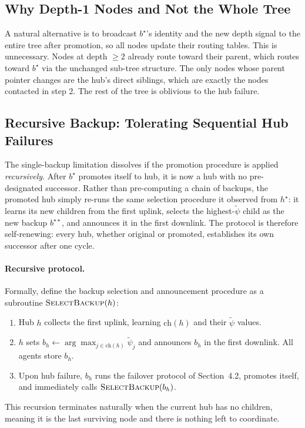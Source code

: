 \documentclass{article}
\begin{document}
\subsection{Why Depth-1 Nodes and Not the Whole Tree}

A natural alternative is to broadcast $b^\star$'s identity and the new depth signal to
the entire tree after promotion, so all nodes update their routing tables. This is
unnecessary. Nodes at depth $\geq 2$ already route toward their parent, which routes
toward $b^\star$ via the unchanged sub-tree structure. The only nodes whose parent
pointer changes are the hub's direct siblings, which are exactly the nodes contacted in
step 2. The rest of the tree is oblivious to the hub failure.

\subsection{Recursive Backup: Tolerating Sequential Hub Failures}

The single-backup limitation dissolves if the promotion procedure is applied
\emph{recursively}. After $b^\star$ promotes itself to hub, it is now a hub with no
pre-designated successor. Rather than pre-computing a chain of backups, the promoted hub
simply re-runs the same selection procedure it observed from $h^\star$: it learns its new
children from the first uplink, selects the highest-$\tilde\psi$ child as the new backup
$b^{\star\star}$, and announces it in the first downlink. The protocol is therefore
self-renewing: every hub, whether original or promoted, establishes its own successor
after one cycle.

\paragraph{Recursive protocol.} Formally, define the backup selection and announcement
procedure as a subroutine $\textsc{SelectBackup}(h)$:
\begin{enumerate}
    \item Hub $h$ collects the first uplink, learning $\mathrm{ch}(h)$ and their
        $\tilde\psi$ values.
    \item $h$ sets $b_h \leftarrow \arg\max_{j \in \mathrm{ch}(h)} \tilde\psi_j$ and
        announces $b_h$ in the first downlink. All agents store $b_h$.
    \item Upon hub failure, $b_h$ runs the failover protocol of Section~4.2, promotes
        itself, and immediately calls $\textsc{SelectBackup}(b_h)$.
\end{enumerate}
This recursion terminates naturally when the current hub has no children, meaning it is
the last surviving node and there is nothing left to coordinate.
\end{document}
